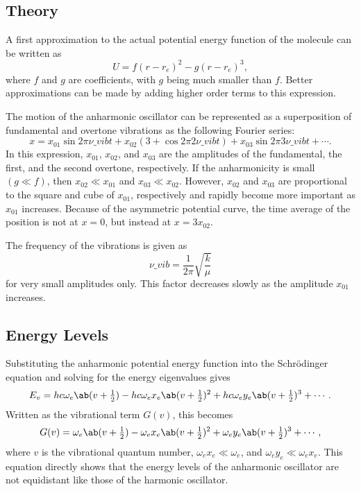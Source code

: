 \subsection{Theory}

A first approximation to the actual potential energy function of the molecule can be written as
\begin{equation*}
    U = f(r - r_{e})^{2} - g(r - r_{e})^{3},
\end{equation*}
where $f$ and $g$ are coefficients, with $g$ being much smaller than $f$. Better approximations can be made by adding higher order terms to this expression.

The motion of the anharmonic oscillator can be represented as a superposition of fundamental and overtone vibrations as the following Fourier series:
\begin{equation*}
    x = x_{01}\sin{2\pi\nu\_{vib}t} + x_{02}(3 + \cos{2\pi2\nu\_{vib}t}) + x_{03}\sin{2\pi3\nu\_{vib}t} + \dotsb.
\end{equation*}
In this expression, $x_{01}$, $x_{02}$, and $x_{03}$ are the amplitudes of the fundamental, the first, and the second overtone, respectively. If the anharmonicity is small $(g \ll f)$, then $x_{02} \ll x_{01}$ and $x_{03} \ll x_{02}$. However, $x_{02}$ and $x_{03}$ are proportional to the square and cube of $x_{01}$, respectively and rapidly become more important as $x_{01}$ increases. Because of the asymmetric potential curve, the time average of the position is not at $x = 0$, but instead at $x = 3x_{02}$.

The frequency of the vibrations is given as
\begin{equation*}
    \nu\_{vib} = \frac{1}{2\pi}\sqrt{\frac{k}{\mu}}
\end{equation*}
for very small amplitudes only. This factor decreases slowly as the amplitude $x_{01}$ increases.

\subsection{Energy Levels}

Substituting the anharmonic potential energy function into the Schr\"odinger equation and solving for the energy eigenvalues gives
\begin{equation*}
    E_{v} = hc\omega_{e}\ab(v + \tfrac{1}{2}) - hc\omega_{e}x_{e}\ab(v + \tfrac{1}{2})^{2} + hc\omega_{e}y_{e}\ab(v + \tfrac{1}{2})^{3} + \dotsb.
\end{equation*}
Written as the vibrational term $G(v)$, this becomes
\begin{equation*}
    G(v) = \omega_{e}\ab(v + \tfrac{1}{2}) - \omega_{e}x_{e}\ab(v + \tfrac{1}{2})^{2} + \omega_{e}y_{e}\ab(v + \tfrac{1}{2})^{3} + \dotsb,
\end{equation*}
where $v$ is the vibrational quantum number, $\omega_{e}x_{e} \ll \omega_{e}$, and $\omega_{e}y_{e} \ll \omega_{e}x_{e}$. This equation directly shows that the energy levels of the anharmonic oscillator are not equidistant like those of the harmonic oscillator.

